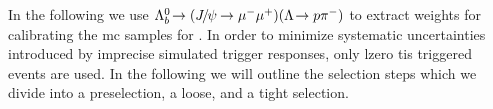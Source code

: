 %

In the following we use ${{\Lambda}^0_{b}}\!\rightarrow ({{J\mskip -3mu/\mskip -2mu\psi\mskip 2mu}}\!\rightarrow {\ensuremath{\mu^-}}{\ensuremath{\mu^+}})({\Lambda}\!\rightarrow {\ensuremath{p}}{\ensuremath{{\pi}^-}})$ to extract weights for calibrating the \gls{mc} samples for \decay{\Lb}{\Dz\Lz}.
In order to minimize systematic uncertainties introduced by imprecise simulated trigger responses, only \gls{lzero} \gls{tis} triggered events are used.
In the following we will outline the selection steps which we divide into a preselection, a loose, and a tight selection.

